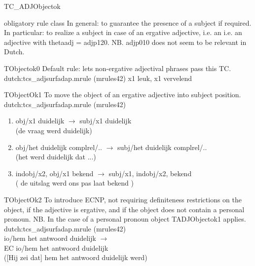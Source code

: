 \begin{mruleclass}{TC\_ADJObjectok}
\begin{classdescr}
\kind obligatory rule class
\classtask 
In general: to guarantee the presence of a subject if required.
In particular: to realize a subject in case of an ergative adjective, i.e. an 
i.e. an adjective with thetaadj = adjp120.
NB. adjp010 does not seem to be relevant in Dutch.
\classremarks
\nofilters
\nospeedrules

\end{classdescr}

\begin{members}
\begin{member}
 TObjectok0
 Default rule: lets  non-ergative adjectival phrases pass this TC.
\file dutch:tcs\_adjsurfadap.mrule (mrules42)
\semantics \nosemantics
\example
x1 leuk, x1 vervelend
\remarks\mbox{}

\end{member}
\begin{member}
 TObjectOk1
 To move the object of an ergative adjective 
into subject  position. 
\file dutch:tcs\_adjsurfadap.mrule (mrules42)
\semantics \nosemantics
\example \mbox{}
\begin{enumerate}
\item
obj/x1 duidelijk $\rightarrow$ subj/x1 duidelijk\\
(de vraag werd duidelijk)\\
\item
obj/het duidelijk complrel/.. $\rightarrow$ subj/het duidelijk complrel/..\\
(het werd duidelijk dat ...)\\
\item
indobj/x2, obj/x1 bekend $\rightarrow$ subj/x1, indobj/x2, bekend\\
( de uitslag werd ons pas laat bekend )\\

\end{enumerate}
\remarks\mbox{}

\end{member}
\begin{member}
 TObjectOk2
To introduce ECNP, not requiring definiteness restrictions on the object,
if the adjective is
ergative, and if the object does not contain a personal pronoun. 
NB. In the case 
of a personal
pronoun object TADJObjectok1  applies.
\file dutch:tcs\_adjsurfadap.mrule (mrules42)
\semantics \nosemantics
\example\mbox{}\\
io/hem het antwoord duidelijk $\rightarrow$\\
EC io/hem het antwoord duidelijk \\
([Hij zei dat] hem het antwoord duidelijk werd)\\
\remarks\mbox{}

\end{member}
\end{members}
\end{mruleclass}

